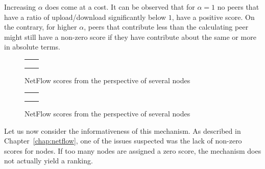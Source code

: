 \documentclass[a4paper,11pt]{book}
\theoremstyle{definition}
\begin{document}
Increasing $\alpha$ does come at a cost. It can be observed that for $\alpha=1$ no peers
that have a ratio of upload/download significantly below $1$, have a positive score. 
On the contrary, for higher $\alpha$, peers that contribute less than the calculating
peer might still have a non-zero score if they have contribute about the same or more
in absolute terms.

\begin{figure}[ht]
    \begin{tabular}[ht]{cc}
         &
         \\

         &
         \\

         &
         \\
    \end{tabular}
    \caption{NetFlow scores from the perspective of several nodes}
    \label{fig:nf_alpha_comparison_1}
\end{figure}

\begin{figure}[ht]
    \begin{tabular}[ht]{cc}
         &
         \\

         &
         \\

         &
         \\
    \end{tabular}
    \caption{NetFlow scores from the perspective of several nodes}
    \label{fig:nf_alpha_comparison_2}
\end{figure}

Let us now consider the informativeness of this mechanism. As described in Chapter~\ref{chap:netflow},
one of the issues suspected was the lack of non-zero scores for nodes. If too many nodes are assigned
a zero score, the mechanism does not actually yield a ranking. 
\end{document}
